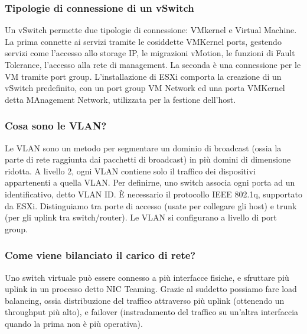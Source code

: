 \documentclass[11pt]{article}
\begin{document}
\subsubsection{Tipologie di connessione di un vSwitch}
Un vSwitch permette due tipologie di connessione: VMkernel e Virtual Machine. La prima connette ai servizi tramite le cosiddette VMKernel ports, gestendo servizi come l'accesso allo storage IP, le migrazioni vMotion, le funzioni di Fault Tolerance, l'accesso alla rete di management. La seconda è una connessione per le VM tramite port group. L'installazione di ESXi comporta la creazione di un vSwitch predefinito, con un port group VM Network ed una porta VMKernel detta MAnagement Network, utilizzata per la festione dell'host. 

\subsubsection{Cosa sono le VLAN?}
Le VLAN sono un metodo per segmentare un dominio di broadcast (ossia la parte di rete raggiunta dai pacchetti di broadcast) in più domini di dimensione ridotta. A livello 2, ogni VLAN contiene solo il traffico dei dispositivi appartenenti a quella VLAN. Per definirne, uno switch associa ogni porta ad un identificativo, detto VLAN ID. È necessario il protocollo IEEE 802.1q, supportato da ESXi. Distinguiamo tra porte di accesso (usate per collegare gli host) e trunk (per gli uplink tra switch/router). Le VLAN si configurano a livello di port group.

\subsubsection{Come viene bilanciato il carico di rete?}
Uno switch virtuale può essere connesso a più interfacce fisiche, e sfruttare più uplink in un processo detto NIC Teaming. Grazie al suddetto possiamo fare load balancing, ossia distribuzione del traffico attraverso più uplink (ottenendo un throughput più alto), e failover (instradamento del traffico su un'altra interfaccia quando la prima non è più operativa). 
\end{document}
